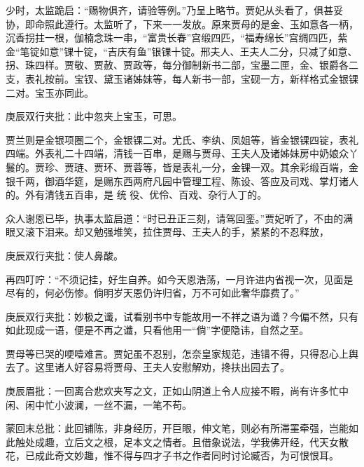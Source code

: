 \begin{parag}
    少时，太监跪启：“赐物俱齐，请验等例。”乃呈上略节。贾妃从头看了，俱甚妥协，即命照此遵行。太监听了，下来一一发放。原来贾母的是金、玉如意各一柄，沉香拐拄一根，伽楠念珠一串，“富贵长春”宫缎四匹，“福寿绵长”宫绸四匹，紫金“笔锭如意”锞十锭，“吉庆有鱼”银锞十锭。邢夫人、王夫人二分，只减了如意、拐、珠四样。贾敬、贾赦、贾政等，每分御制新书二部，宝墨二匣，金、银爵各二支，表礼按前。宝钗、黛玉诸姊妹等，每人新书一部，宝砚一方，新样格式金银锞二对。宝玉亦同此。\begin{note}庚辰双行夹批：此中忽夹上宝玉，可思。\end{note}贾兰则是金银项圈二个，金银锞二对。尤氏、李纨、凤姐等，皆金银锞四锭，表礼四端。外表礼二十四端，清钱一百串，是赐与贾母、王夫人及诸姊妹房中奶娘众丫鬟的。贾珍、贾琏、贾环、贾蓉等，皆是表礼一分，金锞一双。其余彩缎百端，金银千两，御酒华筵，是赐东西两府凡园中管理工程、陈设、答应及司戏、掌灯诸人的。外有清钱五百串，是 统 役、优伶、百戏、杂行人丁的。
\end{parag}


\begin{parag}
    众人谢恩已毕，执事太监启道：“时已丑正三刻，请驾回銮。”贾妃听了，不由的满眼又滚下泪来。却又勉强堆笑，拉住贾母、王夫人的手，紧紧的不忍释放，\begin{note}庚辰双行夹批：使人鼻酸。\end{note}再四叮咛：“不须记挂，好生自养。如今天恩浩荡，一月许进内省视一次，见面是尽有的，何必伤惨。倘明岁天恩仍许归省，万不可如此奢华靡费了。”\begin{note}庚辰双行夹批：妙极之谶，试看别书中专能故用一不祥之语为谶？今偏不然，只有如此现成一语，便是不再之谶，只看他用一“倘”字便隐讳，自然之至。\end{note}贾母等已哭的哽噎难言。贾妃虽不忍别，怎奈皇家规范，违错不得，只得忍心上舆去了。这里诸人好容易将贾母、王夫人安慰解劝，搀扶出园去了。\begin{note}庚辰眉批：一回离合悲欢夹写之文，正如山阴道上令人应接不暇，尚有许多忙中闲、闲中忙小波澜，一丝不漏，一笔不苟。\end{note}
\end{parag}


\begin{parag}
    \begin{note}蒙回末总批：此回铺陈，非身经历，开巨眼，伸文笔，则必有所滞罣牵强，岂能如此触处成趣，立后文之根，足本文之情者。且借象说法，学我佛开经，代天女散花，已成此奇文妙趣，惟不得与四才子书之作者同时讨论臧否，为可恨恨耳。\end{note}
\end{parag}